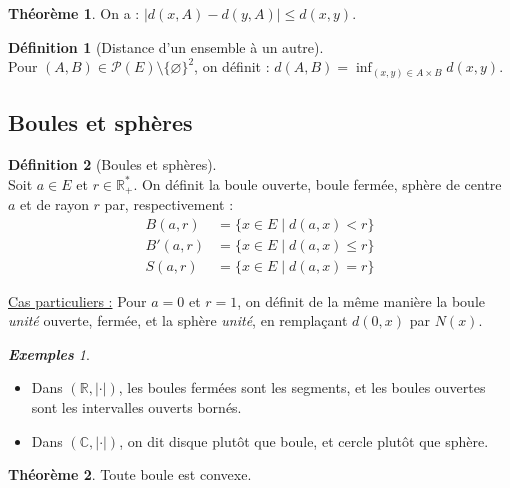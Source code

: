 \documentclass[12pt]{book}
\let\ensembleNombre\mathbb
\newcommand*\R{\ensuremath{\ensembleNombre{R}}}
\newcommand*\C{\ensuremath{\ensembleNombre{C}}}
\theoremstyle{definition}
\newtheorem*{defi}{Définition}
\newtheorem{thme}{Théorème}[chapter]
\theoremstyle{remark}
\newtheorem*{exs}{\textbf{Exemples}}
\newenvironment{fdef}
  {\begin{mdframed}[roundcorner=10pt, linewidth=1pt]\begin{defi}}
  {\end{defi}\end{mdframed}}
\newenvironment{fthme}
  {\begin{mdframed}[roundcorner=10pt, linewidth=2pt]\begin{thme}}
  {\end{thme}\end{mdframed}}
\begin{document}
	\begin{fthme}
	On a : $|d(x,A) - d(y,A)| \leq d(x,y)$.
	\end{fthme}
	
	\begin{fdef}[Distance d'un ensemble à un autre]\mbox{~}\\
	Pour $(A,B) \in \mathcal P(E) \setminus \lbrace \varnothing \rbrace^2$, on définit : $d(A,B) = \inf_{(x,y) \in A\times B} d(x,y)$.
	\end{fdef}\newpage
	
	\subsection{Boules et sphères}
	\begin{fdef}[Boules et sphères]\mbox{~}\\
	Soit $a \in E$ et $r \in \R_+^*$. On définit la boule ouverte, boule fermée, sphère de centre $a$ et de rayon $r$ par, respectivement :
	\begin{align*}
	B(a,r) &= \lbrace x \in E \;|\; d(a,x) < r \rbrace \\
	B'(a,r) &= \lbrace x \in E \;|\; d(a,x) \leq r \rbrace \\
	S(a,r) &= \lbrace x \in E \;|\; d(a,x) = r \rbrace 
	\end{align*}
	\end{fdef}
	
	\underline{Cas particuliers :} Pour $a = 0$ et $r = 1$, on définit de la même manière la boule \textit{unité} ouverte, fermée, et la sphère \textit{unité}, en remplaçant $d(0,x)$ par $N(x)$.
	
	\begin{exs}\mbox{~}\\
	\begin{itemize}
	\item Dans $(\R, |\cdot|)$, les boules fermées sont les segments, et les boules ouvertes sont les intervalles ouverts bornés.
	\item Dans $(\C, |\cdot|)$, on dit disque plutôt que boule, et cercle plutôt que sphère.
	\end{itemize}
	\end{exs}
	
	\begin{fthme}
	Toute boule est convexe.
	\end{fthme}
	
\end{document}

